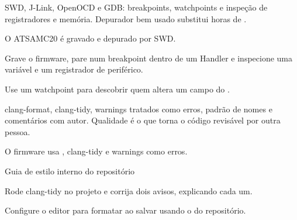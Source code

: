 SWD, J-Link, OpenOCD e GDB: breakpoints, watchpoints e inspeção de registradores e memória. Depurador bem usado substitui horas de .

\begin{noproduto}
O ATSAMC20 é gravado e depurado por SWD.
\end{noproduto}

\begin{paraestudar}
  \item {}
  \item {}
  \item {}
\end{paraestudar}

\begin{pratique}
  \item Grave o firmware, pare num breakpoint dentro de um Handler e inspecione uma variável e um registrador de periférico.
  \item Use um watchpoint para descobrir quem altera um campo do .
\end{pratique}

clang-format, clang-tidy, warnings tratados como erros, padrão de nomes e comentários com autor. Qualidade é o que torna o código revisável por outra pessoa.

\begin{noproduto}
O firmware usa , clang-tidy e warnings como erros.
\end{noproduto}

\begin{paraestudar}
  \item {}
  \item {}
  \item Guia de estilo interno do repositório
\end{paraestudar}

\begin{pratique}
  \item Rode clang-tidy no projeto e corrija dois avisos, explicando cada um.
  \item Configure o editor para formatar ao salvar usando o  do repositório.
\end{pratique}

